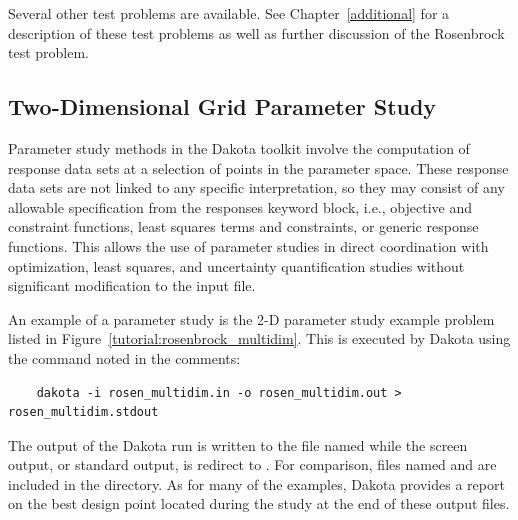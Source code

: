 Several other test problems are available. See
Chapter~\ref{additional} for a description of these test problems
as well as further discussion of the Rosenbrock test problem.


\subsection{Two-Dimensional Grid Parameter Study}\label{tutorial:examples:param_study}

Parameter study methods in the Dakota toolkit involve the computation 
of response data sets at a selection of points in the parameter space. 
These response data sets are not linked to any specific interpretation,
so they may consist of any allowable specification from the responses 
keyword block, i.e., objective and constraint functions, least squares 
terms and constraints, or generic response functions. This allows the 
use of parameter studies in direct coordination with optimization, least 
squares, and uncertainty quantification studies without significant
modification to the input file. 

An example of a parameter study is the 2-D parameter study example problem 
listed in Figure~\ref{tutorial:rosenbrock_multidim}. This is 
executed by Dakota using the command noted in the comments:
\begin{small}
\begin{verbatim}
    dakota -i rosen_multidim.in -o rosen_multidim.out > rosen_multidim.stdout
\end{verbatim}
\end{small}

The output of the Dakota run is written to the file named
 while the screen output, or
standard output, is redirect to .
For comparison, files named 
and  are included in the
 directory. As for many of the examples,
Dakota provides a report on the best design point located during the
study at the end of these output files.

